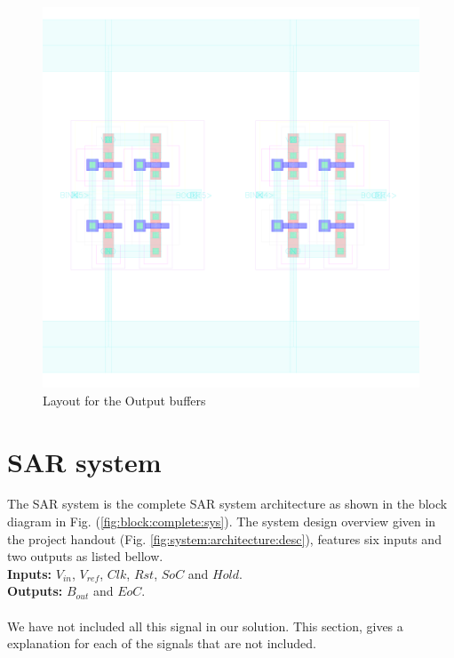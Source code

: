 \documentclass[english, 12pt, a4paper]{ifimaster}
\begin{document}
 \begin{figure}[!ht]
  \centering
  \includegraphics[width=\textwidth]{img/layout/bufferout_one}
  \caption{Layout for the Output buffers}
  \label{fig:layout:buff:out}
 \end{figure}

\section{SAR system}
The SAR system is the complete SAR system architecture as shown in the block diagram in Fig. (\ref{fig:block:complete:sys}).
The system design overview given in the project handout (Fig. \ref{fig:system:architecture:desc}),
features six inputs and two outputs as listed bellow.\\

\noindent \textbf{Inputs:} \(V_{in}\), \(V_{ref}\), \(Clk\), \(Rst\), \(SoC\) and \(Hold\).\\
\noindent \textbf{Outputs:} \(B_{out}\) and \(EoC\).\\
\\
We have not included all this signal in our solution. This section, gives a explanation for 
each of the signals that are not included. 
\end{document}
